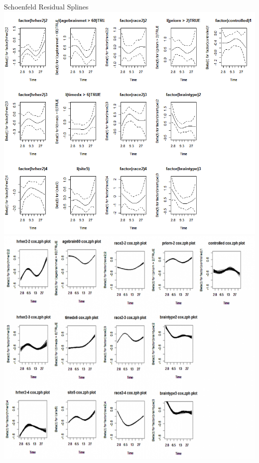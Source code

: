 \begin{frame}{Schoenfeld Residual Splines}
\includegraphics[width=.5\textwidth]{ac_schoenfeld}%
\includegraphics[width=.5\textwidth]{mi_schoenfeld} 
\end{frame}

